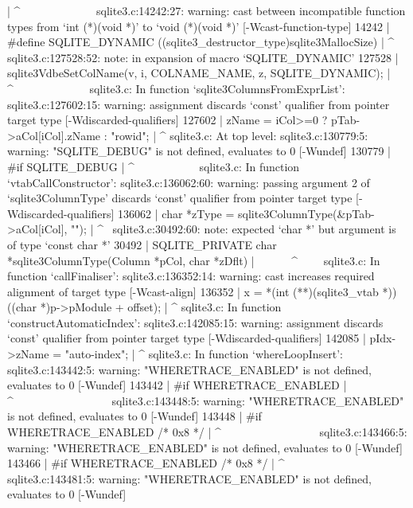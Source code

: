 {{{{{{{{{{{{{{{{{{{       |                                                          ^~~~~~~~~~~~~~
sqlite3.c:14242:27: warning: cast between incompatible function types from ‘int (*)(void *)’ to ‘void (*)(void *)’ [-Wcast-function-type]
14242 | #define SQLITE_DYNAMIC   ((sqlite3_destructor_type)sqlite3MallocSize)
      |                           ^
sqlite3.c:127528:52: note: in expansion of macro ‘SQLITE_DYNAMIC’
127528 |       sqlite3VdbeSetColName(v, i, COLNAME_NAME, z, SQLITE_DYNAMIC);
       |                                                    ^~~~~~~~~~~~~~
sqlite3.c: In function ‘sqlite3ColumnsFromExprList’:
sqlite3.c:127602:15: warning: assignment discards ‘const’ qualifier from pointer target type [-Wdiscarded-qualifiers]
127602 |         zName = iCol>=0 ? pTab->aCol[iCol].zName : "rowid";
       |               ^
sqlite3.c: At top level:
sqlite3.c:130779:5: warning: "SQLITE_DEBUG" is not defined, evaluates to 0 [-Wundef]
130779 | #if SQLITE_DEBUG
       |     ^~~~~~~~~~~~
sqlite3.c: In function ‘vtabCallConstructor’:
sqlite3.c:136062:60: warning: passing argument 2 of ‘sqlite3ColumnType’ discards ‘const’ qualifier from pointer target type [-Wdiscarded-qualifiers]
136062 |         char *zType = sqlite3ColumnType(&pTab->aCol[iCol], "");
       |                                                            ^~
sqlite3.c:30492:60: note: expected ‘char *’ but argument is of type ‘const char *’
30492 | SQLITE_PRIVATE char *sqlite3ColumnType(Column *pCol, char *zDflt){
      |                                                      ~~~~~~^~~~~
sqlite3.c: In function ‘callFinaliser’:
sqlite3.c:136352:14: warning: cast increases required alignment of target type [-Wcast-align]
136352 |         x = *(int (**)(sqlite3_vtab *))((char *)p->pModule + offset);
       |              ^
sqlite3.c: In function ‘constructAutomaticIndex’:
sqlite3.c:142085:15: warning: assignment discards ‘const’ qualifier from pointer target type [-Wdiscarded-qualifiers]
142085 |   pIdx->zName = "auto-index";
       |               ^
sqlite3.c: In function ‘whereLoopInsert’:
sqlite3.c:143442:5: warning: "WHERETRACE_ENABLED" is not defined, evaluates to 0 [-Wundef]
143442 | #if WHERETRACE_ENABLED
       |     ^~~~~~~~~~~~~~~~~~
sqlite3.c:143448:5: warning: "WHERETRACE_ENABLED" is not defined, evaluates to 0 [-Wundef]
143448 | #if WHERETRACE_ENABLED /* 0x8 */
       |     ^~~~~~~~~~~~~~~~~~
sqlite3.c:143466:5: warning: "WHERETRACE_ENABLED" is not defined, evaluates to 0 [-Wundef]
143466 | #if WHERETRACE_ENABLED /* 0x8 */
       |     ^~~~~~~~~~~~~~~~~~
sqlite3.c:143481:5: warning: "WHERETRACE_ENABLED" is not defined, evaluates to 0 [-Wundef]
}}}}}}}}}}}}}}}}}}}}
